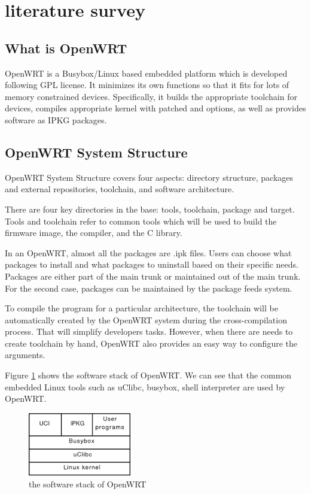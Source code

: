 \documentclass{sig-alternate-05-2015}
\begin{document}
	\section{literature survey}
	
	\subsection{What is OpenWRT}
	OpenWRT \cite{fainelli2008OpenWRT, kim2014implementation} is a Busybox/Linux based embedded platform which is developed following GPL license. It minimizes its own functions so that it fits for lots of memory constrained devices. Specifically, it builds the appropriate toolchain for devices, compiles appropriate kernel with patched and options, as well as provides software as IPKG packages.
	
	\subsection{OpenWRT System Structure}
	OpenWRT System Structure covers four aspects: directory structure, packages and external repositories, toolchain, and software architecture.
	
	There are four key directories in the base: tools, toolchain, package and target.
	Tools and toolchain refer to common tools which will be used to build the firmware image, the compiler, and the C library.
	
	In an OpenWRT, almost all the packages are .ipk files. Users can choose what packages to install and what packages to uninstall based on their specific needs. Packages are either part of the main trunk or maintained out of the main trunk. For the second case, packages can be maintained by the package feeds system.
	
	To compile the program for a particular architecture, the toolchain will be automatically created by the OpenWRT system during the cross-compilation process. That will simplify developers tasks. However, when there are needs to create toolchain by hand, OpenWRT also provides an easy way to configure the arguments.
	
	Figure \ref{OpenWRT:stack} shows the software stack of OpenWRT. We can see that the common embedded Linux tools such as uClibc, busybox, shell interpreter are used by OpenWRT.
	
	\begin{figure}
		\centering
		\includegraphics[width=0.4\textwidth]{stack.png}
		\caption{the software stack of OpenWRT}
		\label{OpenWRT:stack}
	\end{figure}
	
\end{document}
